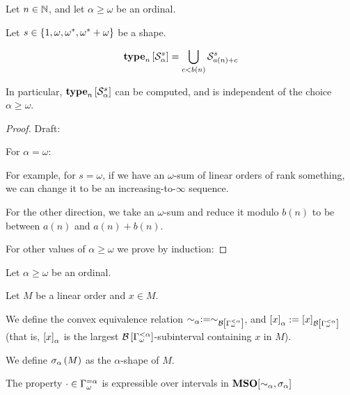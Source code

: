 \begin{lemma}
  Let $n \in \mathbb{N}$, and let $\alpha \ge \omega$ be an ordinal.

  Let $s \in \left\{ {1, \omega, \omega^\ast, \omega^\ast + \omega} \right\}$ be a shape.

  \[\mathbf{type}_{n} \left[ {\mathcal{S}^{s}_{\alpha}} \right] = \bigcup_{c < b(n)}{\mathcal{S}^{s}_{a(n) + c}                                                                                                                                                                                                                                                                                                                                                                                                                                       }\]

  In particular, $\mathbf{type}_{n} \left[ {\mathcal{S}^{s}_{\alpha}} \right]$ can be
  computed, and is independent of the choice $\alpha \ge \omega$.
\end{lemma}

\begin{proof}
  Draft:

  For $\alpha = \omega$:

  For example, for $s = \omega$, if we have an $\omega$-sum
  of linear orders of rank something, we can change it
  to be an increasing-to-$\infty$ sequence.

  For the other direction, we take an $\omega$-sum and reduce it modulo
  $b(n)$ to be between $a(n)$ and $a(n) + b(n)$.

  For other values of $\alpha \ge \omega$ we prove by induction:
\end{proof}

\begin{definition}
  Let $\alpha \ge \omega$ be an ordinal.

  Let $M$ be a linear order and $x \in M$.

  We define the convex equivalence relation $\sim_\alpha := \sim_{\mathcal{B} \left[ {{\Gamma_{\omega}^{< \alpha}}} \right]}$,
  and $\left[ {x} \right]_{\alpha} := \left[ {x} \right]_{\mathcal{B} \left[ {{\Gamma_{\omega}^{< \alpha}}} \right]}$ (that is,
  $\left[ {x} \right]_{\alpha}$ is the largest $\mathcal{B} \left[ {{\Gamma_{\omega}^{< \alpha}}} \right]$-subinterval
  containing $x$ in $M$).

  We define $\sigma_{\alpha} \left( {M} \right)$ as
  the $\alpha$-shape of $M$.
\end{definition}


\begin{lemma}
  The property
  $\cdot \in \Gamma_{\omega}^{= \alpha}$ is expressible over intervals
  in $\mathbf{MSO}[\sim_{\alpha}, \sigma_{\alpha}]$
\end{lemma}

